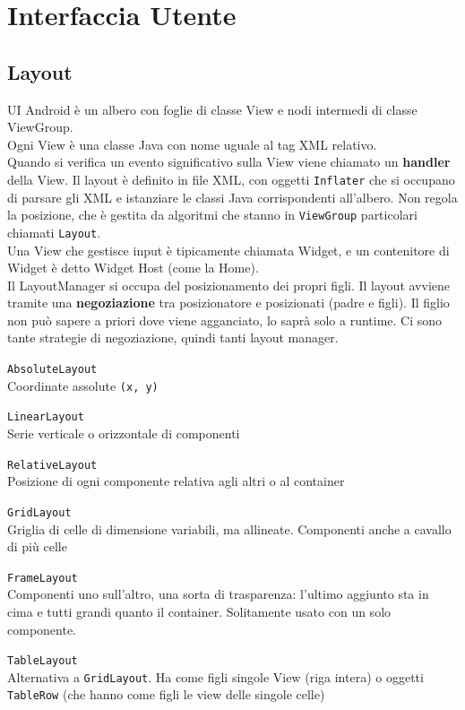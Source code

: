 \documentclass[10pt]{book}
\begin{document}
\chapter{Interfaccia Utente}
\section{Layout}
UI Android è un albero con foglie di classe View e nodi intermedi di classe ViewGroup.\\
Ogni View è una classe Java con nome uguale al tag XML relativo.\\
Quando si verifica un evento significativo sulla View viene chiamato un \textbf{handler} della View. Il layout è definito in file XML, con oggetti \texttt{Inflater} che si occupano di parsare gli XML e istanziare le classi Java corrispondenti all'albero. Non regola la posizione, che è gestita da algoritmi che stanno in \texttt{ViewGroup} particolari chiamati \texttt{Layout}.\\
Una View che gestisce input è tipicamente chiamata Widget, e un contenitore di Widget è detto Widget Host (come la Home).\\
Il LayoutManager si occupa del posizionamento dei propri figli. Il layout avviene tramite una \textbf{negoziazione} tra posizionatore e posizionati (padre e figli). Il figlio non può sapere a priori dove viene agganciato, lo saprà solo a runtime. Ci sono tante strategie di negoziazione, quindi tanti layout manager.
\begin{list}{}{Tra i più comuni, troviamo:}
	\item \texttt{AbsoluteLayout}\\
	Coordinate assolute \texttt{(x, y)}
	\item \texttt{LinearLayout}\\
	Serie verticale o orizzontale di componenti
	\item \texttt{RelativeLayout}\\
	Posizione di ogni componente relativa agli altri o al container
	\item \texttt{GridLayout}\\
	Griglia di celle di dimensione variabili, ma allineate. Componenti anche a cavallo di più celle
	\item \texttt{FrameLayout}\\
	Componenti uno sull'altro, una sorta di trasparenza: l'ultimo aggiunto sta in cima e tutti grandi quanto il container. Solitamente usato con un solo componente.
	\item \texttt{TableLayout}\\
	Alternativa a \texttt{GridLayout}. Ha come figli singole View (riga intera) o oggetti \texttt{TableRow} (che hanno come figli le view delle singole celle)
\end{list}
\end{document}
